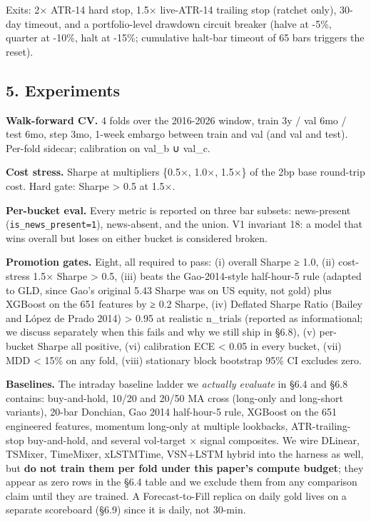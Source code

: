 \documentclass[
]{article}
\begin{document}
Exits: 2× ATR-14 hard stop, 1.5× live-ATR-14 trailing stop (ratchet
only), 30-day timeout, and a portfolio-level drawdown circuit breaker
(halve at -5\%, quarter at -10\%, halt at -15\%; cumulative halt-bar
timeout of 65 bars triggers the reset).

\subsection{5. Experiments}\label{experiments}

\textbf{Walk-forward CV.} 4 folds over the 2016-2026 window, train 3y /
val 6mo / test 6mo, step 3mo, 1-week embargo between train and val (and
val and test). Per-fold sidecar; calibration on val\_b ∪ val\_c.

\textbf{Cost stress.} Sharpe at multipliers \{0.5×, 1.0×, 1.5×\} of the
2bp base round-trip cost. Hard gate: Sharpe \textgreater{} 0.5 at 1.5×.

\textbf{Per-bucket eval.} Every metric is reported on three bar subsets:
news-present (\texttt{is\_news\_present=1}), news-absent, and the union.
V1 invariant 18: a model that wins overall but loses on either bucket is
considered broken.

\textbf{Promotion gates.} Eight, all required to pass: (i) overall
Sharpe ≥ 1.0, (ii) cost-stress 1.5× Sharpe \textgreater{} 0.5, (iii)
beats the Gao-2014-style half-hour-5 rule (adapted to GLD, since Gao's
original 5.43 Sharpe was on US equity, not gold) plus XGBoost on the 651
features by ≥ 0.2 Sharpe, (iv) Deflated Sharpe Ratio (Bailey and López
de Prado 2014) \textgreater{} 0.95 at realistic n\_trials (reported as
informational; we discuss separately when this fails and why we still
ship in §6.8), (v) per-bucket Sharpe all positive, (vi) calibration ECE
\textless{} 0.05 in every bucket, (vii) MDD \textless{} 15\% on any
fold, (viii) stationary block bootstrap 95\% CI excludes zero.

\textbf{Baselines.} The intraday baseline ladder we \emph{actually
evaluate} in §6.4 and §6.8 contains: buy-and-hold, 10/20 and 20/50 MA
cross (long-only and long-short variants), 20-bar Donchian, Gao 2014
half-hour-5 rule, XGBoost on the 651 engineered features, momentum
long-only at multiple lookbacks, ATR-trailing-stop buy-and-hold, and
several vol-target × signal composites. We wire DLinear, TSMixer,
TimeMixer, xLSTMTime, VSN+LSTM hybrid into the harness as well, but
\textbf{do not train them per fold under this paper's compute budget};
they appear as zero rows in the §6.4 table and we exclude them from any
comparison claim until they are trained. A Forecast-to-Fill replica on
daily gold lives on a separate scoreboard (§6.9) since it is daily, not
30-min.
\end{document}
